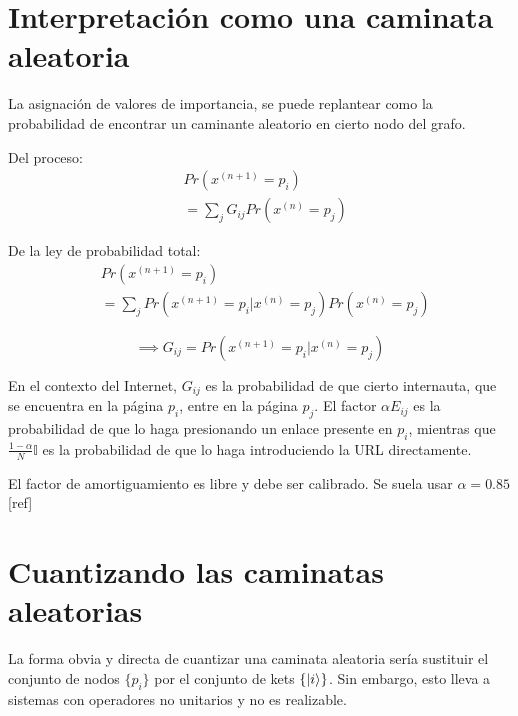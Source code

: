 \section{Interpretación como una caminata aleatoria}

La asignación de valores de importancia, se puede replantear como la probabilidad de encontrar un caminante aleatorio en cierto nodo del grafo.

\color{red}
\begin{minipage}{0.5\linewidth}
Del proceso:
\begin{align*}
& Pr(x^{(n+1)}=p_i) \\
& =\sum\limits_j G_{i j} Pr(x^{(n)}=p_j)
\end{align*}
\end{minipage}
\begin{minipage}{0.5\linewidth}
De la ley de probabilidad total:
\begin{align*}
& Pr(x^{(n+1)}=p_i) \\
& =\sum\limits_j Pr(x^{(n+1)}=p_i|x^{(n)}=p_j) Pr(x^{(n)}=p_j)
\end{align*}
\end{minipage}
\[
\implies G_{i j} = Pr(x^{(n+1)}=p_i | x^{(n)}=p_j)
\]
\color{black}

En el contexto del Internet, $G_{i j}$ es la probabilidad de que cierto internauta, que se encuentra en la página $p_i$, entre en la página $p_j$. El factor $\alpha E_{i j}$ es la probabilidad de que lo haga presionando un enlace presente en $p_i$, mientras que $\frac{1-\alpha}{N} \mathds{I}$ es la probabilidad de que lo haga introduciendo la URL directamente.

El factor de amortiguamiento es libre y debe ser calibrado. Se suela usar $\alpha = 0.85$ [ref]

\section{Cuantizando las caminatas aleatorias}

La forma obvia y directa de cuantizar una caminata aleatoria sería sustituir el conjunto de nodos $\{p_i\}$ por el conjunto de kets $\{\ket{i}\}$. Sin embargo, esto lleva a sistemas con operadores no unitarios y no es realizable.

